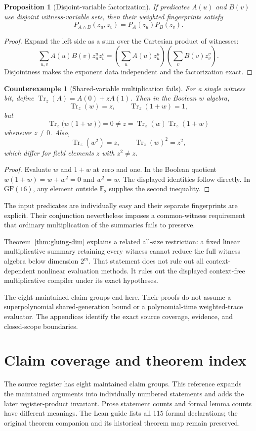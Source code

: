 \documentclass[11pt,letterpaper,oneside]{report}
\theoremstyle{komorebi}
\newtheorem{proposition}[theorem]{Proposition}
\newtheorem{counterexample}[theorem]{Counterexample}
\newcommand{\F}{\mathbb F_2}
\newcommand{\KTr}{\operatorname{Tr}}
\begin{document}
\begin{proposition}[Disjoint-variable factorization]\label{prop:disjoint}
If predicates $A(u)$ and $B(v)$ use disjoint witness-variable sets, then their weighted fingerprints satisfy
\[
 P_{A\land B}(z_u,z_v)=P_A(z_u)P_B(z_v).
\]
\end{proposition}
\begin{proof}
Expand the left side as a sum over the Cartesian product of witnesses:
\[
 \sum_{u,v}A(u)B(v)z_u^uz_v^v
 =\left(\sum_uA(u)z_u^u\right)
  \left(\sum_vB(v)z_v^v\right).
\]
Disjointness makes the exponent data independent and the factorization exact.
\end{proof}

\begin{counterexample}[Shared-variable multiplication fails]\label{ce:overlap}
For a single witness bit, define $\KTr_z(A)=A(0)+zA(1)$. Then in the Boolean $w$ algebra,
\[
 \KTr_z(w)=z,\qquad \KTr_z(1+w)=1,
\]
but
\[
 \KTr_z\bigl(w(1+w)\bigr)=0
 \ne z=\KTr_z(w)\KTr_z(1+w)
\]
whenever $z\ne0$. Also,
\[
 \KTr_z(w^2)=z,\qquad\KTr_z(w)^2=z^2,
\]
which differ for field elements $z$ with $z^2\ne z$.
\end{counterexample}
\begin{proof}
Evaluate $w$ and $1+w$ at zero and one. In the Boolean quotient $w(1+w)=w+w^2=0$ and $w^2=w$. The displayed identities follow directly. In $\mathrm{GF}(16)$, any element outside $\F$ supplies the second inequality.
\end{proof}

The input predicates are individually easy and their separate fingerprints are explicit. Their conjunction nevertheless imposes a common-witness requirement that ordinary multiplication of the summaries fails to preserve.

Theorem~\ref{thm:gluing-dim} explains a related all-size restriction: a fixed linear multiplicative summary retaining every witness cannot reduce the full witness algebra below dimension $2^m$. That statement does not rule out all context-dependent nonlinear evaluation methods. It rules out the displayed context-free multiplicative compiler under its exact hypotheses.

The eight maintained claim groups end here. Their proofs do not assume a superpolynomial shared-generation bound or a polynomial-time weighted-trace evaluator. The appendices identify the exact source coverage, evidence, and closed-scope boundaries.

\appendix
\chapter{Claim coverage and theorem index}
\label{app:index}
The source register has eight maintained claim groups. This reference expands the maintained arguments into individually numbered statements and adds the later register-product invariant. Prose statement counts and formal lemma counts have different meanings. The Lean guide lists all 115 formal declarations; the original theorem companion and its historical theorem map remain preserved.
\end{document}

